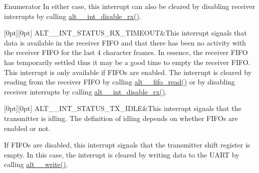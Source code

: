\begin{DoxyEnumFields}{Enumerator}
In either case, this interrupt can also be cleared by disabling receiver interrupts by calling \mbox{\hyperlink{group__UART__INT_ga943c30127cde7b6810b5f16c5b2ff621}{alt\+\_\+\_\+int\+\_\+disable\+\_\+rx()}}. \\
\hline

[0pt][0pt]{}\mbox{\label{group__UART__INT_gga108129e1efabc17da3950f0b654c62d0aa14278e2d38b09b9c64f968612bed198}} 
A\+L\+T\+\_\+\_\+\+I\+N\+T\+\_\+\+S\+T\+A\+T\+U\+S\+\_\+\+R\+X\+\_\+\+T\+I\+M\+E\+O\+UT&This interrupt signals that data is available in the receiver F\+I\+FO and that there has been no activity with the receiver F\+I\+FO for the last 4 character frames. In essence, the receiver F\+I\+FO has temporarily settled thus it may be a good time to empty the receiver F\+I\+FO. This interrupt is only available if F\+I\+F\+Os are enabled. The interrupt is cleared by reading from the receiver F\+I\+FO by calling \mbox{\hyperlink{group__UART__FIFO_ga0ce2f31d207024b0f240b2020ab6fd94}{alt\+\_\+\_\+fifo\+\_\+read()}} or by disabling receiver interrupts by calling \mbox{\hyperlink{group__UART__INT_ga943c30127cde7b6810b5f16c5b2ff621}{alt\+\_\+\_\+int\+\_\+disable\+\_\+rx()}}. \\
\hline

[0pt][0pt]{}\mbox{\label{group__UART__INT_gga108129e1efabc17da3950f0b654c62d0a7854ba28db6c7b7bbedd40ef32d773d5}} 
A\+L\+T\+\_\+\_\+\+I\+N\+T\+\_\+\+S\+T\+A\+T\+U\+S\+\_\+\+T\+X\+\_\+\+I\+D\+LE&This interrupt signals that the transmitter is idling. The definition of idling depends on whether F\+I\+F\+Os are enabled or not.

If F\+I\+F\+Os are disabled, this interrupt signals that the transmitter shift register is empty. In this case, the interrupt is cleared by writing data to the U\+A\+RT by calling \mbox{\hyperlink{group__UART__BASIC_gac16e07d06c432803c734854ab9789dcd}{alt\+\_\+\_\+write()}}.


\end{DoxyEnumFields}
